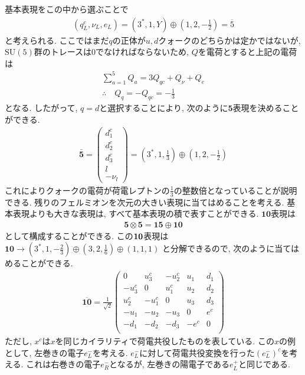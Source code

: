 \documentclass[uplatex,dvipdfmx,a4paper,titlepage]{jsbook}
\theoremstyle{plain}
\theoremstyle{definition}
\begin{document}
{基本表現をこの中から選ぶことで
\begin{align}
  (q_L^c, \nu_L, e_L) = (3^*, 1, Y)\oplus\left(1,2,-\frac{1}{2}\right) = \overline{5}
\end{align}
と考えられる.
ここではまだ$q$の正体が$u, d$クォークのどちらかは定かではないが, $\mathrm{SU}(5)$群のトレースは0でなければならないため, $Q$を電荷とすると上記の電荷は
\begin{align}
  \sum_{a=1}^5 Q_a = 3Q_{qc}+Q_\nu + Q_e\nonumber\\
  \therefore\quad Q_q = -Q_{qc} = -\frac{1}{3}\label{quantum_Q}
\end{align}
となる.
したがって, $q=d$と選択することにより, 次のように$\bm{5}$表現を決めることができる.
\begin{align}
 \bar{\bm{5}}=\begin{pmatrix}
    d_1 ^c \\
    d_2 ^c \\
    d_3 ^c \\
    l      \\
    -\nu_l
  \end{pmatrix}=\left({3}^*,1,\frac{1}{3}\right)\oplus \left(1,2,-\frac{1}{2}\right)\label{GUT-5rep}
\end{align}
これによりクォークの電荷が荷電レプトンの$\frac{1}{3}$の整数倍となっていることが説明できる.
残りのフェルミオンを次元の大きい表現に当てはめることを考える.
基本表現よりも大きな表現は, すべて基本表現の積で表すことができる.
${\bm{10}}$表現は
\begin{align}
  \bm{5}\otimes\bm{5} = \bm{15}\oplus\bm{10}\nonumber
\end{align}
として構成することができる.
この$\bf{10}$表現は$\bm{10}\rightarrow (3^*,1,-\frac{2}{3})\oplus(3,2,\frac{1}{6})\oplus(1,1,1)$
と分解できるので, 次のように当てはめることができる.
\begin{align}
  \overline{\bm{10}}= \frac{1}{\sqrt{2}}\begin{pmatrix}
         0 &  u_3^c & -u_2^c & u_1 & d_1 \\
    -u_3^c &      0 &  u_1^c & u_2 & d_2 \\
     u_2^c & -u_1^c &      0 & u_3 & d_3 \\
    -u_1   &   -u_2 &   -u_3 &   0 & e^c \\
      -d_1 &   -d_2 &   -d_3 &-e^c &   0 \\
    \end{pmatrix}\label{GUT-10rep}
\end{align}
ただし, $x^c$は$x$を同じカイラリティで荷電共役したものを表している.
この$x$の例として, 左巻きの電子$e^-_L$を考える.
$e^-_L$に対して荷電共役変換を行った$(e^-_L)^c$を考える.
これは右巻きの電子$e_R^-$となるが, 左巻きの陽電子である$e_L^+$と同じである.
}
\end{document}
